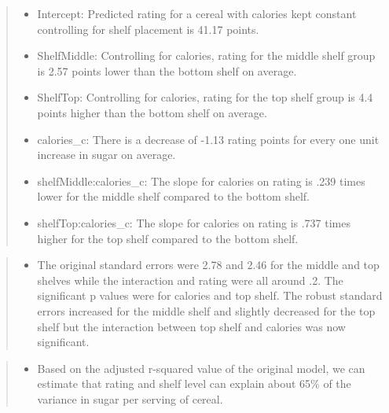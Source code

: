 \documentclass[]{article}
\providecommand{\tightlist}{%
  \setlength{\itemsep}{0pt}\setlength{\parskip}{0pt}}
\begin{document}
\begin{quote}
\begin{itemize}
\tightlist
\item
  Intercept: Predicted rating for a cereal with calories kept constant
  controlling for shelf placement is 41.17 points.
\item
  ShelfMiddle: Controlling for calories, rating for the middle shelf
  group is 2.57 points lower than the bottom shelf on average.
\item
  ShelfTop: Controlling for calories, rating for the top shelf group is
  4.4 points higher than the bottom shelf on average.
\item
  calories\_c: There is a decrease of -1.13 rating points for every one
  unit increase in sugar on average.
\item
  shelfMiddle:calories\_c: The slope for calories on rating is .239
  times lower for the middle shelf compared to the bottom shelf.
\item
  shelfTop:calories\_c: The slope for calories on rating is .737 times
  higher for the top shelf compared to the bottom shelf.
\end{itemize}
\end{quote}

\begin{quote}
\begin{itemize}
\tightlist
\item
  The original standard errors were 2.78 and 2.46 for the middle and top
  shelves while the interaction and rating were all around .2. The
  significant p values were for calories and top shelf. The robust
  standard errors increased for the middle shelf and slightly decreased
  for the top shelf but the interaction between top shelf and calories
  was now significant.
\end{itemize}
\end{quote}

\begin{quote}
\begin{itemize}
\tightlist
\item
  Based on the adjusted r-squared value of the original model, we can
  estimate that rating and shelf level can explain about 65\% of the
  variance in sugar per serving of cereal.
\end{itemize}
\end{quote}
\end{document}
